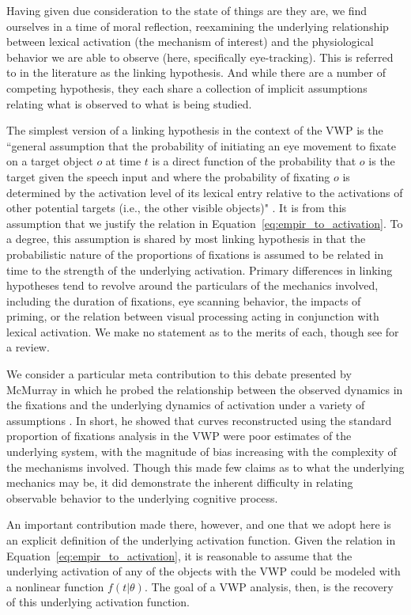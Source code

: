\documentclass{article}
\begin{document}
Having given due consideration to the state of things are they are, we find ourselves in a time of moral reflection, reexamining the underlying relationship between lexical activation (the mechanism of interest) and the physiological behavior we are able to observe (here, specifically eye-tracking). This is referred to in the literature as the linking hypothesis. And while there are a number of competing hypothesis, they each share a collection of implicit assumptions relating what is observed to what is being studied.

The simplest version of a linking hypothesis in the context of the VWP is the ``general assumption that the probability of initiating an eye movement to fixate on a target object $o$ at time $t$ is a direct function of the probability that $o$ is the target given the speech input and where the probability of fixating $o$ is determined by the activation level of its lexical entry relative to the activations of other potential targets (i.e., the other visible objects)" \cite{allopenna1998tracking}. It is from this assumption that we justify the relation in Equation~\ref{eq:empir_to_activation}. To a degree, this assumption is shared by most linking hypothesis in that the probabilistic nature of the proportions of fixations is assumed to be related in time to the strength of the underlying activation. Primary differences in linking hypotheses tend to revolve around the particulars of the mechanics involved, including the duration of fixations, eye scanning behavior, the impacts of priming, or the relation between visual  processing acting in conjunction with lexical activation. We make no statement as to the merits of each, though see \cite{Magnuson2019} for a review.

We consider a particular meta contribution to this debate presented by McMurray in which he probed the relationship between the observed dynamics in the fixations and the underlying dynamics of activation under a variety of assumptions \cite{mcmurray2022m}. In short, he showed that curves reconstructed using the standard proportion of fixations analysis in the VWP were poor estimates of the underlying system, with the magnitude of bias increasing with the complexity of the mechanisms involved. Though this made few claims as to what the underlying mechanics may be, it did demonstrate the inherent difficulty in relating observable behavior to the underlying cognitive process.

An important contribution made there, however, and one that we adopt here is an explicit definition of the underlying activation function. Given the relation in Equation~\ref{eq:empir_to_activation}, it is reasonable to assume that the underlying activation of any of the objects with the VWP could be modeled with a nonlinear function $f(t|\theta)$. The goal of a VWP analysis, then, is the recovery of this underlying activation function.
\end{document}
